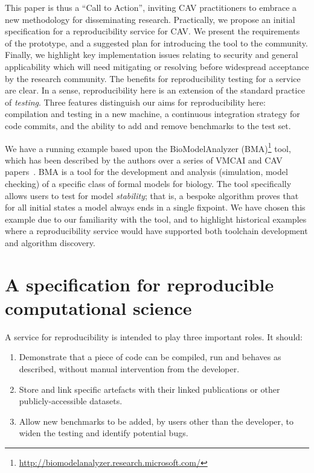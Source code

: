 \documentclass{llncs}
\begin{document}
This paper is thus a ``Call to Action'', inviting CAV practitioners to
embrace a new methodology for disseminating research. Practically, we
propose an initial specification for a reproducibility service for CAV. We
present the requirements of the prototype, and a suggested plan for
introducing the tool to the community. Finally, we highlight key
implementation issues relating to security and general applicability
which will need mitigating or resolving before widespread acceptance
by the research community.  The benefits for reproducibility testing
for a service are clear. In a sense, reproducibility here is an
extension of the standard practice of \emph{testing}.  Three features
distinguish our aims for reproducibility here: compilation and testing
in a new machine, a continuous integration strategy for code commits,
and the ability to add and remove benchmarks to the test set.

We have a running example based upon the BioModelAnalyzer
(BMA)\footnote{\url{http://biomodelanalyzer.research.microsoft.com/}}
tool, which has been described by the authors over a series of VMCAI
and CAV
papers~\cite{cook-et-al:2011,benque-et-al:2012,cook-et-al:2014}.
BMA is a tool for the development and analysis (simulation, model
checking) of a specific class of formal models for biology. The tool
specifically allows users to test for model \emph{stability}; that
is, a bespoke algorithm proves that for all initial states a model
always ends in a single fixpoint. We have chosen this example due to
our familiarity with the tool, and to highlight historical examples
where a reproducibility service would have supported both
toolchain development and algorithm discovery.



\section{A specification for reproducible computational science}\label{spec}

A service for reproducibility is intended to play three important
roles. It should:

\begin{enumerate}
	\item Demonstrate that a piece of code can be compiled, run and behaves as described,
		without manual intervention from the developer.
	\item Store and link specific artefacts with their linked publications
		or other publicly-accessible datasets.
	\item Allow new benchmarks to be added, by users other than the developer, to
		widen the testing and identify potential bugs.
\end{enumerate}
\end{document}
